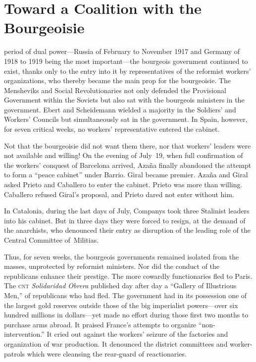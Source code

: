 \chapter{Toward a Coalition with the Bourgeoisie}

 period of dual power—Russia of February to November 1917 and Germany of 1918 to 1919 being the most important—the bourgeois government continued to exist, thanks only to the entry into it by representatives of the reformist workers’ organizations, who thereby became the main prop for the bourgeoisie. The Mensheviks and Social Revolutionaries not only defended the Provisional Government within the Soviets but also sat with the bourgeois ministers in the government. Ebert and Scheidemann wielded a majority in the Soldiers’ and Workers’ Councils but simultaneously sat in the government. In Spain, however, for seven critical weeks, no workers’ representative entered the cabinet.

Not that the bourgeoisie did not want them there, nor that workers’ leaders were not available and willing! On the evening of July~19, when full confirmation of the workers’ conquest of Barcelona arrived, Azaña finally abandoned the attempt to form a ``peace cabinet'' under Barrio. Giral became premier. Azaña and Giral asked Prieto and Caballero to enter the cabinet. Prieto was more than willing. Caballero refused Giral’s proposal, and Prieto dared not enter without him.

In Catalonia, during the last days of July, Companys took three Stalinist leaders into his cabinet. But in three days they were forced to resign, at the demand of the anarchists, who denounced their entry as disruption of the leading role of the Central Committee of~Militias.

Thus, for seven weeks, the bourgeois governments remained isolated from the masses, unprotected by reformist ministers. Nor did the conduct of the republicans enhance their prestige. The more cowardly functionaries fled to Paris. The \textsc{cnt} \emph{Solidaridad Obrera} published day after day a ``Gallery of Illustrious Men,'' of republicans who had fled. The government had in its possession one of the largest gold reserves outside those of the big imperialist powers—over six hundred millions in dollars—yet made no effort during those first two months to purchase arms abroad. It praised France’s attempts to organize ``non-intervention.'' It cried out against the workers’ seizure of the factories and organization of war production. It denounced the district committees and worker-patrols which were cleansing the rear-guard of reactionaries.

